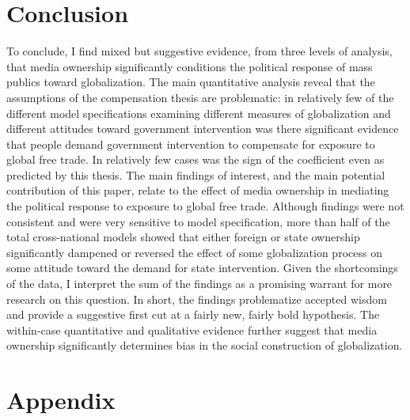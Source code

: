 \documentclass[12pt]{report}
\begin{document}
\section{Conclusion}

To conclude, I find mixed but suggestive evidence, from three levels of analysis, that media
ownership significantly conditions the political response of mass publics toward globalization. The
main quantitative analysis reveal that the assumptions of the compensation thesis are problematic:
in relatively few of the different model specifications examining different measures of
globalization and different attitudes toward government intervention was there significant evidence
that people demand government intervention to compensate for exposure to global free trade. In
relatively few cases was the sign of the coefficient even as predicted by this thesis. The main
findings of interest, and the main potential contribution of this paper, relate to the effect of
media ownership in mediating the political response to exposure to global free trade. Although
findings were not consistent and were very sensitive to model specification, more than half of the
total cross-national models showed that either foreign or state ownership significantly dampened or
reversed the effect of some globalization process on some attitude toward the demand for state
intervention. Given the shortcomings of the data, I interpret the sum of the findings as a promising
warrant for more research on this question. In short, the findings problematize accepted wisdom and
provide a suggestive first cut at a fairly new, fairly bold hypothesis. The within-case quantitative
and qualitative evidence further suggest that media ownership significantly determines bias in the
social construction of globalization.


\section{Appendix}
\end{document}

